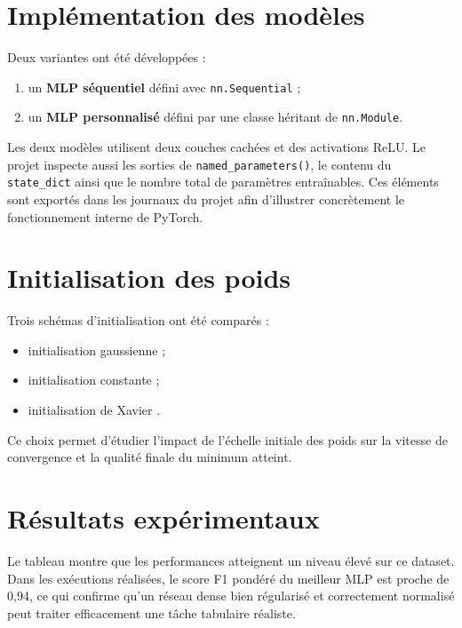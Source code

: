 \section{Implémentation des modèles}
Deux variantes ont été développées :
\begin{enumerate}
    \item un \textbf{MLP séquentiel} défini avec \texttt{nn.Sequential} ;
    \item un \textbf{MLP personnalisé} défini par une classe héritant de \texttt{nn.Module}.
\end{enumerate}
Les deux modèles utilisent deux couches cachées et des activations ReLU. Le projet inspecte aussi les sorties de \texttt{named\_parameters()}, le contenu du \texttt{state\_dict} ainsi que le nombre total de paramètres entraînables. Ces éléments sont exportés dans les journaux du projet afin d’illustrer concrètement le fonctionnement interne de PyTorch.

\section{Initialisation des poids}
Trois schémas d’initialisation ont été comparés :
\begin{itemize}[leftmargin=1.2cm]
    \item initialisation gaussienne ;
    \item initialisation constante ;
    \item initialisation de Xavier \citep{glorot2010understanding}.
\end{itemize}
Ce choix permet d’étudier l’impact de l’échelle initiale des poids sur la vitesse de convergence et la qualité finale du minimum atteint.

\section{Résultats expérimentaux}
\begin{table}[H]
    \centering
    \caption{Comparaison des variantes de MLP et des initialisations.}
\end{table}
Le tableau montre que les performances atteignent un niveau élevé sur ce dataset. Dans les exécutions réalisées, le score F1 pondéré du meilleur MLP est proche de 0,94, ce qui confirme qu’un réseau dense bien régularisé et correctement normalisé peut traiter efficacement une tâche tabulaire réaliste.

